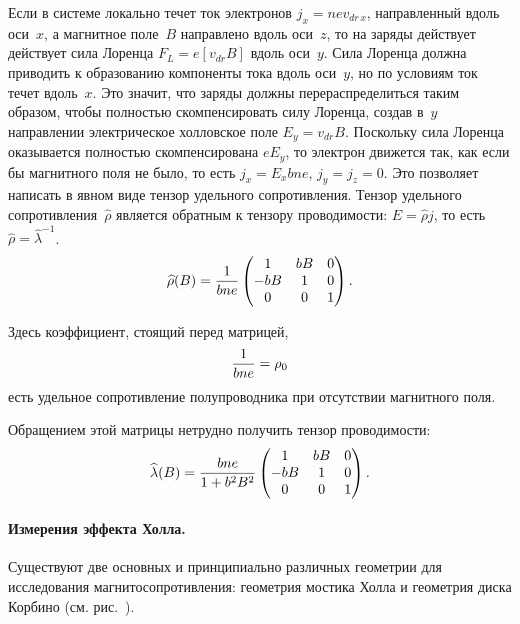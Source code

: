 Если в системе локально течет ток электронов $j_x=nev_{dr\, x}$, направленный
вдоль оси~$x$, а магнитное поле~$B$ направлено вдоль оси~$z$, то на заряды
действует действует сила Лоренца $ F_{L}=e[v_{dr}B]$ вдоль оси~$y$.
Сила Лоренца должна приводить к образованию компоненты тока вдоль оси~$y$, но по
условиям ток течет вдоль~$x$. Это значит, что заряды должны перераспределиться
таким образом, чтобы полностью скомпенсировать силу
Лоренца, создав в~$y$ направлении электрическое холловское поле $E_y=v_{dr}B$.
Поскольку сила Лоренца
оказывается полностью скомпенсирована $eE_y$, то электрон движется так, как если
бы магнитного поля не
было, то есть $j_x=E_xbne$, $j_y=j_z=0$. Это позволяет написать в явном виде
тензор удельного сопротивления.
Тензор удельного сопротивления~$\widehat{\rho}$ является обратным к тензору
проводимости: $E=\widehat{\rho}j$, то есть
$\widehat{\rho}=\widehat{\lambda}^{-1}$.
\begin{equation}
	\widehat{\rho}(B)=\frac{1}{bne}\left(
	\begin{matrix}
		{1} & {bB} & {0} \\
		{-bB} &{1}& {0} \\
		{0} &{0}& {1}
	\end{matrix}
	\right).
	\eqmark{3.17}
\end{equation}

Здесь коэффициент, стоящий перед матрицей,
\begin{equation}
	\frac{1}{bne} = \rho_0
	\eqmark{UdSoprot}
\end{equation}
есть удельное сопротивление полупроводника при отсутствии магнитного поля.

Обращением этой матрицы нетрудно получить тензор проводимости:
\begin{equation}
	\widehat{\lambda}(B)=\frac{bne}{1+b^2B^2}\left(
	\begin{matrix}
		{1} & {bB} & {0} \\
		{-bB} &{1}& {0} \\
		{0} &{0}& {1}\\
	\end{matrix}
	\right).
	\eqmark{3.18}
\end{equation}

\todo[inline]{<---}

\paragraph{Измерения эффекта Холла.}
Существуют две основных и принципиально различных геометрии для исследования
магнитосопротивления: геометрия
мостика Холла и геометрия диска Корбино (см. рис.~).

